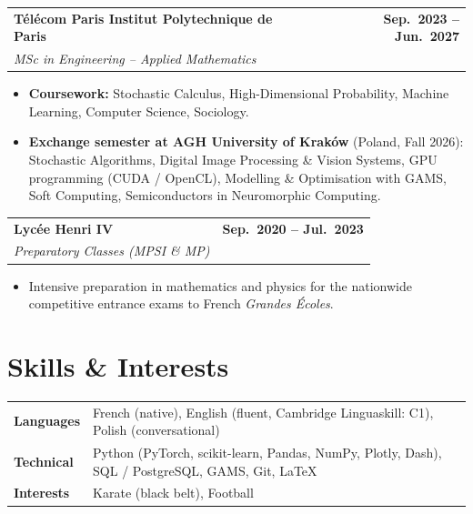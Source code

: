 \documentclass[a4paper,10pt]{article}
\makeatletter
\newcommand{\cventry}[4]{%
  \noindent
  \begin{tabularx}{\textwidth}{@{}X@{\hspace{6pt}}r@{}}
    \textbf{#1} & \textbf{#3}\\
    \textit{#2} & \\
  \end{tabularx}
  \par\vspace{-1pt}
  #4
  \vspace{5pt}
}
\makeatother
\begin{document}
\cventry{T\'el\'ecom Paris \textbar{} Institut Polytechnique de Paris}%
  {MSc in Engineering -- Applied Mathematics}{Sep.~2023 -- Jun.~2027}{%
  \begin{itemize}
    \item \textbf{Coursework:} Stochastic Calculus, High-Dimensional Probability, Machine Learning, Computer Science, Sociology.
    \item \textbf{Exchange semester at AGH University of Krak\'ow} (Poland, Fall 2026): Stochastic Algorithms, Digital Image Processing \& Vision Systems, GPU programming (CUDA / OpenCL), Modelling \& Optimisation with GAMS, Soft Computing, Semiconductors in Neuromorphic Computing.
  \end{itemize}
}

\cventry{Lyc\'ee Henri IV}%
  {Preparatory Classes (MPSI \& MP)}{Sep.~2020 -- Jul.~2023}{%
  \begin{itemize}
    \item Intensive preparation in mathematics and physics for the nationwide competitive entrance exams to French \textit{Grandes \'Ecoles}.
  \end{itemize}
}

\section{Skills \& Interests}

\begin{tabularx}{\textwidth}{@{}>{\bfseries}p{1.9cm} X@{}}
  Languages   & French (native), English (fluent, Cambridge Linguaskill: C1), Polish (conversational) \\[2pt]
  Technical   & Python (PyTorch, scikit-learn, Pandas, NumPy, Plotly, Dash), SQL / PostgreSQL, GAMS, Git, \LaTeX{} \\[2pt]
  Interests   & Karate (black belt), Football \\
\end{tabularx}
\end{document}
